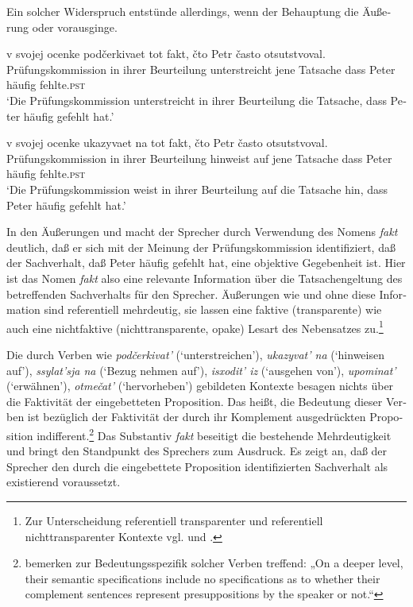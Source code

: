 \documentclass[output=paper]{langscibook}
\begin{document}
\begin{otherlanguage}{german}
\z

\noindent Ein solcher Widerspruch entstünde allerdings, wenn der Behauptung  die Äußerung  oder  vorausginge.

\ea \label{ex:zi83:45}
     v svojej ocenke podčerkivaet tot fakt, čto Petr často otsutstvoval. \\
    Prüfungskommission in ihrer Beurteilung unterstreicht jene Tatsache dass Peter häufig fehlte.\textsc{pst} \\
    \glt ‘Die Prüfungskommission unterstreicht in ihrer Beurteilung die Tatsache, dass Peter häufig gefehlt hat.’

\ex \label{ex:zi83:46}
     v svojej ocenke ukazyvaet na tot fakt, čto Petr často otsutstvoval. \\
    Prüfungskommission in ihrer Beurteilung hinweist auf jene Tatsache dass Peter häufig fehlte.\textsc{pst} \\
    \glt ‘Die Prüfungskommission weist in ihrer Beurteilung auf die Tatsache hin, dass Peter häufig gefehlt hat.’
\z

\noindent In den Äußerungen  und  macht der Sprecher durch Verwendung des Nomens \textit{fakt} deutlich, daß er sich mit der Meinung der Prüfungskommission identifiziert, daß der Sachverhalt, daß Peter häufig gefehlt hat, eine objektive Gegebenheit ist. Hier ist das
Nomen \textit{fakt} also eine relevante Information über die Tatsachengeltung des betreffenden Sachverhalts für den Sprecher. Äußerungen wie  und  ohne diese Information sind referentiell mehrdeutig, sie lassen eine faktive (transparente) wie auch eine nichtfaktive (nichttransparente, opake) Lesart des Nebensatzes zu.\footnote{Zur Unterscheidung referentiell transparenter und referentiell nichttransparenter Kontexte vgl. \citet[261 ff.]{katz1972semantic-theory} und \citet[169]{seuren1975tussen-taal-en-denken:-een-bijdrage-tot-de-empirische-funderingen-van-de-semantiek.-deutsche-ubersetzung:-zwischen-sprache-und-denken:-ein-beitrag-zur-empirischen-begrundung-der-semantik}.}


Die durch Verben wie \textit{podčerkivat’} (‘unterstreichen’), \textit{ukazyvat’ na} (‘hinweisen auf’), \textit{ssylat’sja na} (‘Bezug nehmen auf’), \textit{isxodit’ iz} (‘ausgehen von’), \textit{upominat’} (‘erwähnen’), \textit{otmečat’} (‘hervorheben’) gebildeten Kontexte besagen nichts über die Faktivität der eingebetteten Proposition. Das heißt, die Bedeutung dieser Verben ist bezüglich der Faktivität der durch ihr Komplement ausgedrückten Proposition indifferent.\footnote{\citet[163]{kiparsky1970fact} bemerken zur Bedeutungsspezifik solcher Verben treffend: „On a deeper level, their semantic specifications include no specifications as to whether their complement sentences represent presuppositions by the speaker or not.“} Das Substantiv \textit{fakt} beseitigt die bestehende Mehrdeutigkeit und bringt den Standpunkt des Spre\-chers zum Ausdruck. Es zeigt an, daß der Sprecher den durch die eingebettete Proposition identifizierten Sachverhalt als existierend voraussetzt.


\end{otherlanguage}
\end{document}
